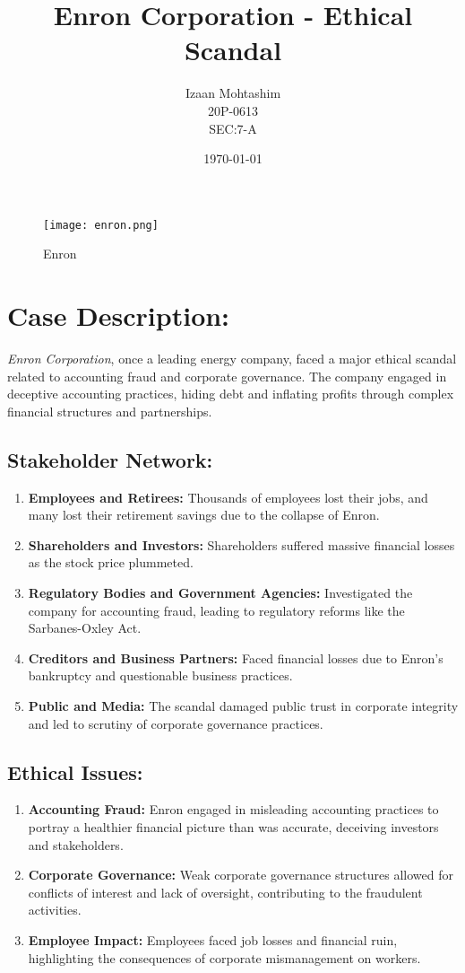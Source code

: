 \documentclass{article}
\title{Enron Corporation - Ethical Scandal}
\author{Izaan Mohtashim \\ 20P-0613 \\ SEC:7-A}
\date{\today}
\begin{document}
\maketitle
\begin{figure}[h]
    \centering
    \texttt{[image: enron.png]}
    \caption{Enron}
\end{figure}

\section*{Case Description:}

\textit{Enron Corporation}, once a leading energy company, faced a major ethical scandal related to accounting fraud and corporate governance. The company engaged in deceptive accounting practices, hiding debt and inflating profits through complex financial structures and partnerships.

\subsection*{Stakeholder Network:}
\begin{enumerate}
    \item \textbf{Employees and Retirees:} Thousands of employees lost their jobs, and many lost their retirement savings due to the collapse of Enron.
    \item \textbf{Shareholders and Investors:} Shareholders suffered massive financial losses as the stock price plummeted.
    \item \textbf{Regulatory Bodies and Government Agencies:} Investigated the company for accounting fraud, leading to regulatory reforms like the Sarbanes-Oxley Act.
    \item \textbf{Creditors and Business Partners:} Faced financial losses due to Enron's bankruptcy and questionable business practices.
    \item \textbf{Public and Media:} The scandal damaged public trust in corporate integrity and led to scrutiny of corporate governance practices.
\end{enumerate}

\subsection*{Ethical Issues:}
\begin{enumerate}
    \item \textbf{Accounting Fraud:} Enron engaged in misleading accounting practices to portray a healthier financial picture than was accurate, deceiving investors and stakeholders.
    \item \textbf{Corporate Governance:} Weak corporate governance structures allowed for conflicts of interest and lack of oversight, contributing to the fraudulent activities.
    \item \textbf{Employee Impact:} Employees faced job losses and financial ruin, highlighting the consequences of corporate mismanagement on workers.
\end{enumerate}
\end{document}
